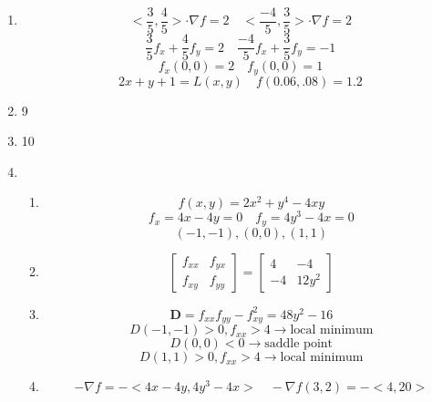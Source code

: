 \documentclass[12pt]{article}
\begin{document}
\begin{enumerate}
\item $$<\frac{3}{5}, \frac{4}{5}> \cdot \nabla f = 2 \quad <\frac{-4}{5}, \frac{3}{5}> \cdot \nabla f = 2$$
$$\frac{3}{5}f_x+\frac{4}{5}f_y=2 \quad \frac{-4}{5}f_x+\frac{3}{5}f_y=-1$$
$$f_x (0,0) = 2 \quad f_y(0,0)=1$$
$$2x+y+1=L(x,y) \quad f(0.06, .08) = 1.2$$
\item 9
\item 10
\item \begin{enumerate}
\item $$f(x,y) = 2x^2+y^4-4xy$$
$$f_x = 4x-4y = 0 \quad f_y = 4y^3-4x=0$$
$$(-1,-1), (0,0), (1,1)$$
\item 
$$
\begin{bmatrix}
   f_{xx} & f_{yx} \\
   f_{xy} & f_{yy}
\end{bmatrix}
=
\begin{bmatrix}
   4 & -4 \\
   -4 & 12y^2
\end{bmatrix}$$
\item $$\textbf{D} = f_{xx}f_{yy} - f_{xy}^2 = 48y^2-16$$
$$D(-1,-1) > 0, f_{xx} > 4 \rightarrow \textrm{local minimum}$$
$$D(0,0) < 0 \rightarrow \textrm{saddle point}$$
$$D(1,1) > 0, f_{xx} > 4 \rightarrow \textrm{local minimum}$$
\item $$-\nabla f = -<4x-4y, 4y^3-4x> \quad -\nabla f(3,2) = -<4, 20>$$
\end{enumerate}
\end{enumerate} 
\end{document}
